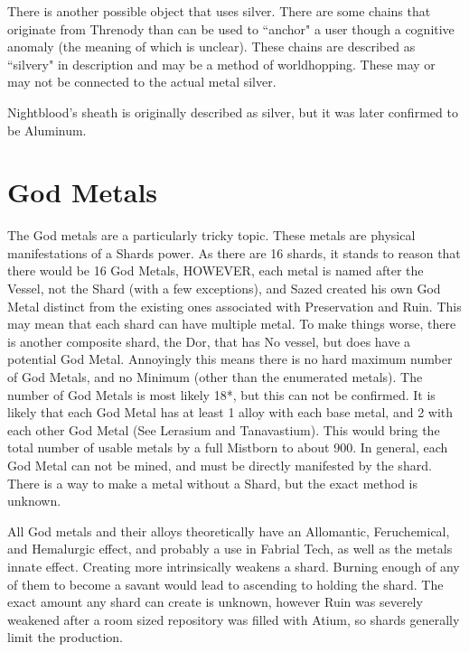 \documentclass[conference]{IEEEtran}
\begin{document}
There is another possible object that uses silver.  There are some chains that originate from Threnody than can be used to ``anchor" a user though a cognitive anomaly (the meaning of which is unclear).\cite{anchor}\cite{RoW-CH64}  These chains are described as ``silvery" in description and may be a method of worldhopping.  These may or may not be connected to the actual metal silver.

Nightblood's sheath is originally described as silver, but it was later confirmed to be Aluminum.\cite{WB-pre}\cite{al-night}

\section*{God Metals}
The God metals are a particularly tricky topic.  These metals are physical manifestations of a Shards power.\cite{HoA-CH75}  As there are 16 shards, it stands to reason that there would be 16 God Metals,\cite{SH-PT3-CH2} HOWEVER, each metal is named after the Vessel, not the Shard (with a few exceptions), and Sazed created his own God Metal distinct from the existing ones associated with Preservation and Ruin.\cite{harmonium-existance}\cite{harm-split} This may mean that each shard can have multiple metal.  To make things worse, there is another composite shard,\cite{arcanum-sel} the Dor, that has No vessel,\cite{WoK-ep22} but does have a potential God Metal.\cite{dorium}  Annoyingly this means there is no hard maximum number of God Metals, and no Minimum (other than the enumerated metals).  The number of God Metals is most likely 18*, but this can not be confirmed.  It is likely that each God Metal has at least 1 alloy with each base metal,\cite{shard-alloy} and 2 with each other God Metal (See Lerasium and Tanavastium).\cite{leras-alloy}  This would bring the total number of usable metals by a full Mistborn to about 900.  In general, each God Metal can not be mined,\cite{TFE-CH13} and must be directly manifested by the shard.\cite{RoW-CH84}  There is a way to make a metal without a Shard, but the exact method is unknown.\cite{godmaking}

All God metals and their alloys theoretically have an Allomantic, Feruchemical, and Hemalurgic effect,\cite{FEH+} and probably a use in Fabrial Tech,\cite{godrial} as well as the metals innate effect.\cite{FEH+}  Creating more intrinsically weakens a shard.\cite{HoA}\cite{WoF}  Burning enough of any of them to become a savant would lead to ascending to holding the shard.\cite{godvant}
The exact amount any shard can create is unknown, however Ruin was severely weakened after a room sized repository was filled with Atium,\cite{HoA-CH81} so shards generally limit the production.
\end{document}
